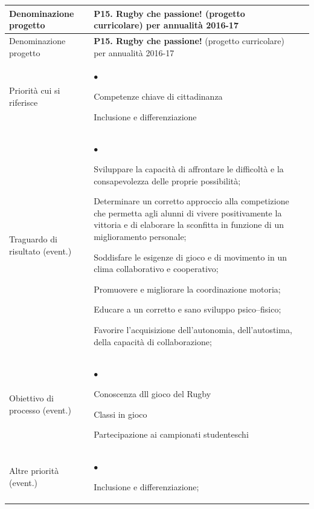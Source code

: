 \documentclass[12pt,a4paper,oneside]{memoir}
\newenvironment{elenco}{\begin{list}{$\bullet$}{%
              \setlength{\leftmargin}{4mm}%
              \setlength{\rightmargin}{1mm}%
               \setlength{\itemindent}{0mm}%
               \setlength{\labelwidth}{2mm}%
               \setlength{\labelsep}{2mm}%
              \setlength{\itemsep}{-\parsep}%
              \setlength{\partopsep}{0pt}%
              \setlength{\topsep}{0pt}%
             \setlength{\parskip}{0pt}%
              }}{\end{list}}
\begin{document}
\begin{footnotesize}
\begin{longtable}{|>{\raggedright}p{2.5cm}|>{\raggedright\arraybackslash}P{10cm}|}
\hline
{}
\label{P15}Denominazione progetto&\textbf{P15. Rugby che passione!} (progetto curricolare) per annualità 2016-17 \\ \hline \endfirsthead
\hline
{}
Denominazione progetto&\textbf{P15. Rugby che passione!} (progetto curricolare) per annualità 2016-17 \\ \hline \endhead
{}
\endfoot
\hline
\endlastfoot
Priorità cui si riferisce&
\begin{elenco}
\item Competenze chiave di cittadinanza
\item Inclusione e differenziazione
\end{elenco}\\[-4mm] \hline
Traguardo di risultato (event.)&
\begin{elenco}
\item Sviluppare la capacità di affrontare le difficoltà e la consapevolezza delle proprie possibilità;
\item Determinare un corretto approccio alla competizione che permetta agli alunni di vivere positivamente la vittoria e di elaborare la sconfitta in funzione di un miglioramento personale;
\item Soddisfare le esigenze di gioco e di movimento in un clima collaborativo e cooperativo;
\item Promuovere e migliorare la coordinazione motoria;
\item Educare a un corretto e sano sviluppo psico–fisico;
\item Favorire l'acquisizione dell'autonomia, dell'autostima, della capacità di collaborazione;
\end{elenco}\\[-4mm] \hline
Obiettivo di processo (event.)&
\begin{elenco}
\item Conoscenza dll gioco del Rugby
\item Classi in gioco
\item Partecipazione ai campionati studenteschi
\end{elenco} \\ \hline
Altre priorità (event.)&
\begin{elenco}
\item Inclusione e differenziazione;

\end{elenco}
\end{longtable}
\end{footnotesize}
\end{document}
